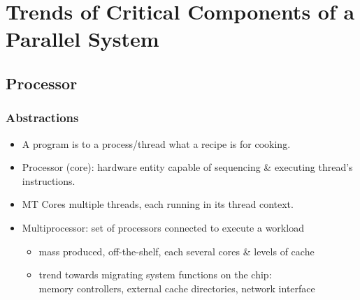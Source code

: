 \documentclass{beamer}
\newcommand{\emp}[1]{\textcolor{DikuRed}{ #1}}
\begin{document}

\section{Trends of Critical Components of a Parallel System}

\begin{frame}[fragile]
	\tableofcontents[currentsection]
\end{frame}

\subsection{Processor}

\begin{frame}[fragile,t]
\frametitle{Abstractions}
\medskip

\begin{itemize}
    \item A \emp{program} is to a \emp{process/thread} 
            what a recipe is for cooking.\smallskip

    \item \emp{Processor (core)}: hardware entity capable of
            sequencing \& executing thread's instructions.\smallskip

    \item \emp{MT Cores} multiple threads, each 
            running in its thread context.\smallskip

    \item \emp{Multiprocessor:} set of processors connected to execute a workload
        \begin{itemize}
            \item mass produced, off-the-shelf, each several cores \& levels of cache
            \item trend towards migrating system functions on the chip:\\
                    memory controllers, external cache directories, network interface
        \end  {itemize}
\end{itemize}


\end{frame}
\end{document}
